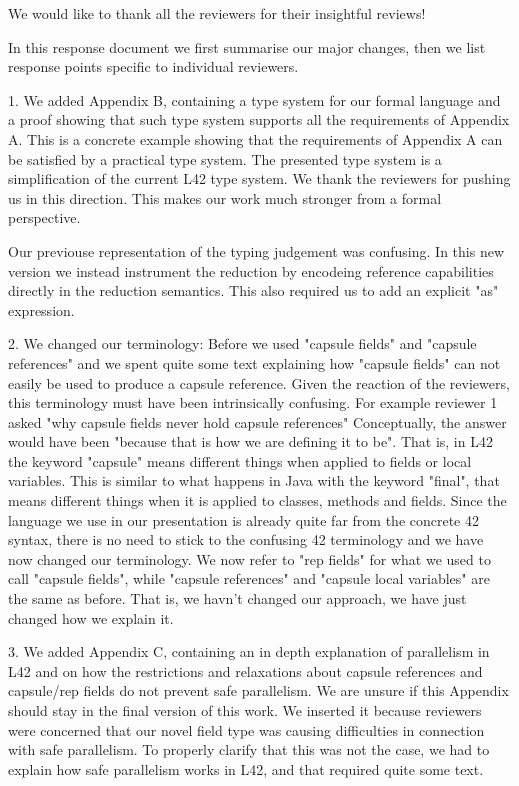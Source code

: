 We would like to thank all the reviewers for their insightful reviews!

In this response document we first summarise our major changes, then we list response points specific to individual reviewers.

1.  We added Appendix B, containing a type system for our formal language and a proof showing that such type system
supports all the requirements of Appendix A. This is a concrete example showing that the requirements of Appendix A
can be satisfied by a practical type system. The presented type system is a simplification of the current L42 type system.
We thank the reviewers for pushing us in this direction. This makes our work much stronger from a formal perspective.

Our previouse representation of the typing judgement was confusing. In this new version we instead instrument the
reduction by encodeing reference capabilities directly in the reduction semantics. This also required us to add an explicit "as" expression.

2. We changed our terminology:
Before we used "capsule fields" and "capsule references" and we spent quite some text explaining how 
"capsule fields" can not easily be used to produce a capsule reference. Given the reaction of the reviewers, this terminology must have been intrinsically confusing.
For example reviewer 1 asked "why capsule fields never hold capsule references"
Conceptually, the answer would have been "because that is how we are defining it to be".
That is, in L42 the keyword "capsule" means different things when applied to fields or local variables.
This is similar to what happens in Java with the keyword "final", that means different things when it is applied to classes, methods and fields.
Since the language we use in our presentation is already quite far from the concrete 42 syntax, there is no need to stick to the confusing 42 terminology and we have now changed our terminology.
We now refer to "rep fields" for what we used to call "capsule fields",
while "capsule references" and "capsule local variables" are the same as before.
That is, we havn't changed our approach, we have just changed how we explain it.

3. We added Appendix C, containing an in depth explanation of parallelism in L42 and on how the restrictions and relaxations
 about capsule references and capsule/rep fields do not prevent safe parallelism.
We are unsure if this Appendix should stay in the final version of this work. 
We inserted it because reviewers were concerned that our novel field type was causing difficulties in connection with safe parallelism.
To properly clarify that this was not the case, we had to explain how safe parallelism works in L42, and that required quite some text.

